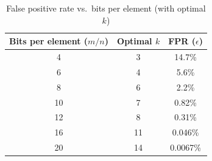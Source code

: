 \begin{table}[H]
  \centering
  \caption{False positive rate vs.\ bits per element (with optimal $k$)}
  \label{tab:bloom-fpr}
  \begin{tabular}{c c c}
    \hline
    \textbf{Bits per element} ($m/n$) & \textbf{Optimal $k$} & \textbf{FPR} ($\epsilon$) \\
    \hline
    4  & 3  & 14.7\%   \\
    6  & 4  & 5.6\%   \\
    8  & 6  & 2.2\%  \\
    10 & 7  & 0.82\% \\
    12 & 8  & 0.31\% \\
    16 & 11 & 0.046\% \\
    20 & 14 & 0.0067\% \\
    \hline
  \end{tabular}
\end{table}

